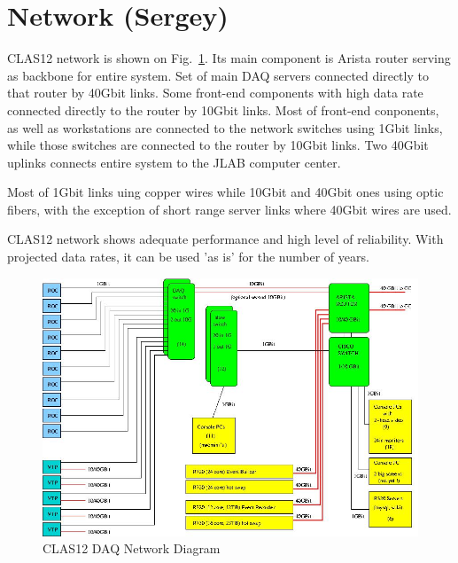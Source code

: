 \section{Network (Sergey)}

CLAS12 network is shown on Fig.~\ref{fig:network_diagram}. Its main component is Arista router serving as backbone for entire system. Set of main DAQ servers connected directly to that router by 40Gbit links. Some front-end components with high data rate connected directly to the router by 10Gbit links. Most of front-end conponents, as well as workstations are connected to the network switches using 1Gbit links, while those switches are connected to the router by 10Gbit links. Two 40Gbit uplinks connects entire system to the JLAB computer center.

Most of 1Gbit links uing copper wires while 10Gbit and 40Gbit ones using optic fibers, with the exception of short range server links where 40Gbit wires are used.

CLAS12 network shows adequate performance and high level of reliability. With projected data rates, it can be used 'as is' for the number of years.

\begin{figure}[hbt]
	\centering
	\includegraphics[width=1.0\columnwidth,keepaspectratio]{img/CLAS12_NET_1.jpg}
	\caption{CLAS12 DAQ Network Diagram}
	\label{fig:network_diagram}
\end{figure}
